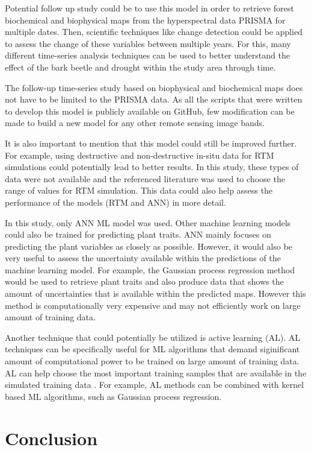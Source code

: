 \documentclass[a4paper, twoside]{templates/ociamthesis}
\begin{document}
Potential follow up study could be to use this model in order to retrieve forest biochemical and biophysical maps from the hyperspectral data PRISMA for multiple dates. Then, scientific techniques like change detection could be applied to assess the change of these variables between multiple years. For this, many different time-series analysis techniques can be used to better understand the effect of the bark beetle and drought within the study area through time.

The follow-up time-series study based on biophysical and biochemical maps does not have to be limited to the PRISMA data. As all the scripts that were written to develop this model is publicly available on GitHub, few modification can be made to build a new model for any other remote sensing image bands.

It is also important to mention that this model could still be improved further. For example, using destructive and non-destructive in-situ data for RTM simulations could potentially lead to better results. In this study, these types of data were not available and the referenced literature was used to choose the range of values for RTM simulation. This data could also help assess the performance of the models (RTM and ANN) in more detail.

In this study, only ANN ML model was used. Other machine learning models could also be trained for predicting plant traits. ANN mainly focuses on predicting the plant variables as closely as possible. However, it would also be very useful to assess the uncertainty available within the predictions of the machine learning model. For example, the Gaussian process regression method would be used to retrieve plant traits and also produce data that shows the amount of uncertainties that is available within the predicted maps. However this method is computationally very expensive and may not efficiently work on large amount of training data.

Another technique that could potentially be utilized is active learning (AL). AL techniques can be specifically useful for ML algorithms that demand siginificant amount of computational power to be trained on large amount of training data. AL can help choose the most important training samples that are available in the simulated training data \citep{verrelst2016active}. For example, AL methods can be combined with kernel based ML algorithms, such as Gaussian process regression.

\hypertarget{conclusion}{%
\chapter{Conclusion}\label{conclusion}}
\end{document}
